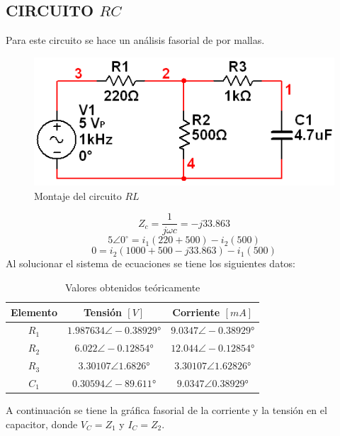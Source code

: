 \documentclass[twocolumn]{IEEEtran}
\begin{document}
\subsection{CIRCUITO $RC$}
\noindent
Para este circuito se hace un análisis fasorial de por mallas.
\begin{figure}[H]
	\centering
		\includegraphics[scale=0.5]{circ2.png}
	\caption{Montaje del circuito $RL$}
	\label{fig6}
\end{figure}
\noindent
\begin{equation}
 Z_c = \frac{1}{{j\omega c}} =  - j33.863
\label{ecu27}
\end{equation}
\begin{equation}
 5\angle 0^\circ  = {i_1}(220 + 500) - {i_2}(500)
\label{ecu28}
\end{equation}
\begin{equation}
 0 = {i_2}\left( {1000 + 500 - j33.863} \right) - {i_1}(500)
\label{ecu29}
\end{equation}
\noindent
Al solucionar el sistema de ecuaciones se tiene los siguientes datos:
\begin{table}[H]
	\centering
\begin{tabular}[c]{|c|c|c|} \hline
Elemento & Tensión $[V]$ & Corriente $[mA]$ \\ \hline
$R_1$ & $1.987634 \angle -0.38929°$ & $9.0347 \angle -0.38929°$ \\ \hline
$R_2$ & $6.022 \angle -0.12854°$ & $12.044 \angle -0.12854°$ \\ \hline
$R_3$ & $3.30107 \angle 1.6826°$ & $3.30107 \angle 1.62826°$ \\ \hline
$C_1$ & $0.30594 \angle -89.611°$ & $9.0347 \angle 0.38929°$ \\ \hline
\end{tabular}
	\caption{Valores obtenidos teóricamente}
	\label{tab4}
\end{table}
\noindent
A continuación se tiene la gráfica fasorial de la corriente y la tensión en el capacitor, donde $V_C=Z_1$ y $I_C=Z_2$.
\end{document}

